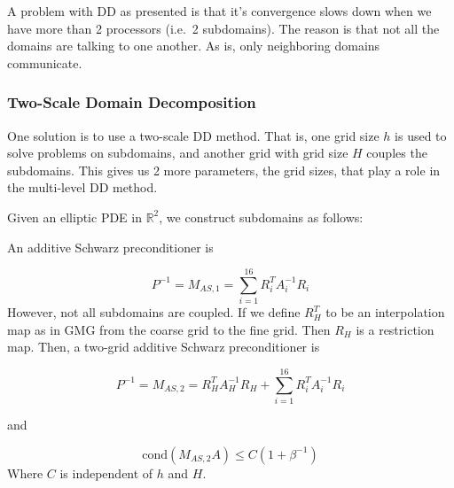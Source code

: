 A problem with DD as presented is that it's convergence slows down when we have
more than 2 processors (i.e.\ 2 subdomains). The reason is that not all the
domains are talking to one another. As is, only neighboring domains
communicate.

\subsubsection{Two-Scale Domain Decomposition}

One solution is to use a two-scale DD method. That is, one grid size $h$ is
used to solve problems on subdomains, and another grid with grid size $H$
couples the subdomains. This gives us 2 more parameters, the grid sizes, that
play a role in the multi-level DD method.

Given an elliptic PDE in $\mathbb{R}^2$, we construct subdomains as follows:

\begin{center}
    
\end{center}

An additive Schwarz preconditioner is

\begin{equation*}
    P^{-1} = M_{AS, 1} = \sum_{i=1}^{16} R_i^TA_i^{-1}R_i
\end{equation*}
However, not all subdomains are coupled. If we define $R_H^T$ to be an interpolation map as in GMG from the coarse grid to the fine grid. Then $R_H$ is a restriction map. Then, a two-grid additive Schwarz preconditioner is

\begin{equation*}
    P^{-1} = M_{AS, 2} = R_H^TA_H^{-1}R_H+\sum_{i=1}^{16} R_i^TA_i^{-1}R_i
\end{equation*}

and

\begin{equation*}
    \text{cond}(M_{AS, 2}A) \leq C (1+\beta^{-1})
\end{equation*}
Where $C$ is independent of $h$ and $H$.


